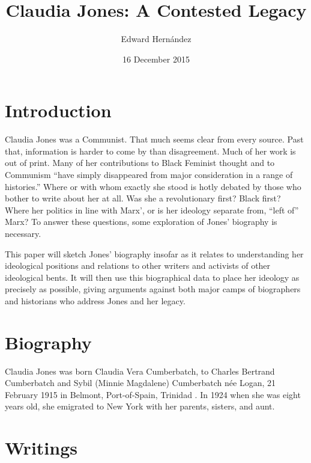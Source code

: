 \documentclass[man,12pt,natbib]{apa6}
\begin{document}
\title{Claudia Jones: A Contested Legacy}
\author{Edward Hern\'{a}ndez}
\date{16 December 2015}
\maketitle


\section{Introduction}

Claudia Jones was a Communist. That much seems clear from every source. Past
that, information is harder to come by than disagreement.  Much of her work is
out of print. Many of her contributions to Black Feminist thought and to
Communism ``have simply disappeared from major consideration in a range of
histories.''\citep[Ch.~1]{Davies11} Where or with whom exactly she stood is
hotly debated by those who bother to write about her at all. Was she a
revolutionary first? Black first? Where her politics in line with Marx', or is
her ideology separate from, ``left of''\citep{Davies11} Marx?  To answer these
questions, some exploration of Jones' biography is necessary.

This paper will sketch Jones' biography insofar as it relates to understanding
her ideological positions and relations to other writers and activists of other
ideological bents. It will then use this biographical data to place her
ideology as precisely as possible, giving arguments against both major camps of
biographers and historians who address Jones and her legacy.

\section{Biography}

Claudia Jones was born Claudia Vera Cumberbatch, to Charles Bertrand
Cumberbatch and Sybil (Minnie Magdalene) Cumberbatch n{\'{e}}e Logan, 21
February 1915 in Belmont, Port-of-Spain, Trinidad
\citep[Chronology~section]{Davies08}. In 1924 when she was eight years old, she
emigrated to New York with her parents, sisters, and aunt.

\section{Writings}
\end{document}
